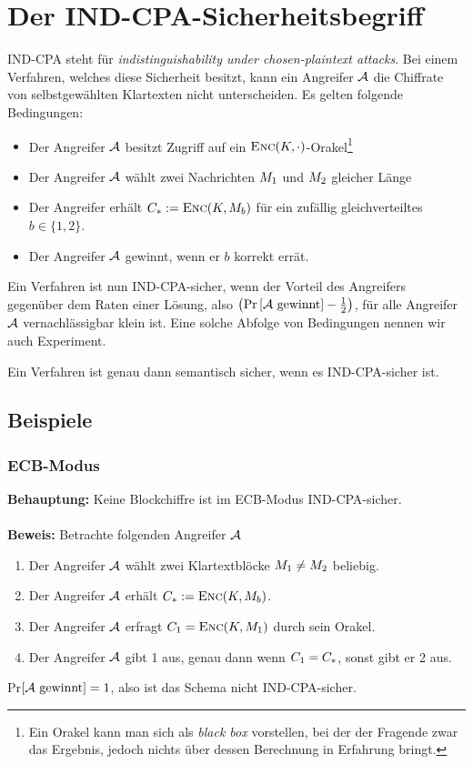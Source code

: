 \section{Der IND-CPA-Sicherheitsbegriff}
\label{def:ind-cpa}
IND-CPA steht für \emph{indistinguishability under chosen-plaintext attacks}. Bei einem Verfahren, welches diese Sicherheit besitzt, kann ein Angreifer $\mathcal{A}$
die Chiffrate von selbstgewählten Klartexten nicht unterscheiden. Es gelten folgende Bedingungen:
\begin{itemize}
\item Der Angreifer $\mathcal{A}$ besitzt Zugriff auf ein $\textsc{Enc}(K,\cdot)$-Orakel\footnote{Ein Orakel kann man sich als \textit{black box} vorstellen, bei der der Fragende zwar das Ergebnis, jedoch nichts über dessen Berechnung in Erfahrung bringt.}
\item Der Angreifer $\mathcal{A}$ wählt zwei Nachrichten $M_1$ und $M_2$ gleicher Länge
\item Der Angreifer erhält $C_* := \textsc{Enc}(K, M_{b})$  für ein zufällig gleichverteiltes $b \in \{1, 2\}$.
\item Der Angreifer $\mathcal{A}$ gewinnt, wenn er $b$ korrekt errät.
\end{itemize}
Ein Verfahren ist nun IND-CPA-sicher, wenn der Vorteil des Angreifers gegenüber dem Raten einer Lösung, also $ \left( \text{Pr} \left[ \mathcal{A} \text{
gewinnt} \right] - \frac{1}{2} \right)$, für alle Angreifer $\mathcal{A}$ vernachlässigbar klein ist. Eine solche Abfolge von Bedingungen nennen wir auch Experiment.
\vspace{10pt}

\begin{theorem}
Ein Verfahren ist genau dann semantisch sicher, wenn es IND-CPA-sicher ist.
\end{theorem}

\subsection{Beispiele}
\subsubsection{ECB-Modus}
\textbf{Behauptung:} Keine Blockchiffre ist im ECB-Modus IND-CPA-sicher.~\\\\
\textbf{Beweis:} Betrachte folgenden Angreifer $\mathcal{A}$
\begin{enumerate}[Schr{i}tt 1:]
    \item Der Angreifer $\mathcal{A}$ wählt zwei Klartextblöcke $M_1 \neq M_2$ beliebig.
    \item Der Angreifer $\mathcal{A}$ erhält $C_* := \textsc{Enc}(K, M_{b})$.
    \item Der Angreifer $\mathcal{A}$ erfragt $C_1 = \textsc{Enc}(K, M_1)$ durch sein Orakel.
    \item Der Angreifer $\mathcal{A}$ gibt 1 aus, genau dann wenn $C_1 = C_*$, sonst gibt er 2 aus.
\end{enumerate}
Pr$\left[ \mathcal{A} \text{ gewinnt} \right] = 1$, also ist das Schema nicht IND-CPA-sicher.

